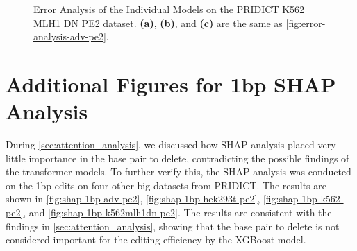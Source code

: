 \begin{figure}[ht]
    \centering
    \caption[Error Analysis of the Individual Models on PRIDICT K562 MLH1 DN PE2 dataset]{Error Analysis of the Individual Models on the PRIDICT K562 MLH1 DN PE2 dataset. \textbf{(a)}, \textbf{(b)}, and \textbf{(c)} are the same as \autoref{fig:error-analysis-adv-pe2}.}
    \label{fig:error-analysis-k562mlh1dn-pe2}
\end{figure}

\begin{figure}
    
\end{figure}

\newpage

\section{Additional Figures for 1bp SHAP Analysis}
\label{appendix:shap-1bp-pridict}

During \autoref{sec:attention_analysis}, we discussed how SHAP analysis placed very little importance in the base pair to delete, contradicting the possible findings of the transformer models. To further verify this, the SHAP analysis was conducted on the 1bp edits on four other big datasets from PRIDICT. The results are shown in \autoref{fig:shap-1bp-adv-pe2}, \autoref{fig:shap-1bp-hek293t-pe2}, \autoref{fig:shap-1bp-k562-pe2}, and \autoref{fig:shap-1bp-k562mlh1dn-pe2}. The results are consistent with the findings in \autoref{sec:attention_analysis}, showing that the base pair to delete is not considered important for the editing efficiency by the XGBoost model.

